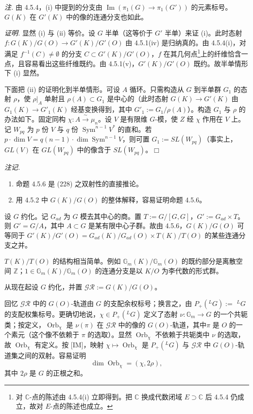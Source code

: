 \emph{注.} 由 4.5.4，(i) 中提到的分支由 $\operatorname{Im}(\pi_1(G)\to\pi_1(G'))$ 的元素标号。$G(K)$ 在 $G'(K)$ 中的像的连通分支也如此。

\emph{证明.} 显然 (i) 与 (ii) 等价。设 $G$ 半单（这等价于 $G'$ 半单）来证 (i)。此时态射 $f:G(K)/G(O)\to G'(K)/G'(O)$ 由 4.5.1(iv) 是归纳真的。由 4.5.4(i)，对满足 $f^{-1}(C)\ne\emptyset$ 的分支 $C\subset G'(K)/G'(O)$，$f$ 在其几何点\footnote{对 $\mathbb{C}$-点的陈述由 4.5.4(i) 立即得到。把 $\mathbb{C}$ 换成代数闭域 $E\supset\mathbb{C}$ 后 4.5.4 仍成立，故对 $E$-点的陈述也成立。}上的纤维恰含一点，且容易看出这些纤维既约。由 4.5.1(v)，$G'(K)/G'(O)$ 既约。故半单情形下 (i) 显然。


下面把 (ii) 的证明化到半单情形。可设 $A$ 循环。只需构造从 $G$ 到半单群 $G_1$ 的态射 $\rho$，使 $\rho|_A$ 单射且 $\rho(A)\subset G_1$ 是中心的（此时态射 $G(K)\to G'(K)$ 由 $G_1(K)\to G'_1(K)$ 经基变换得到，其中 $G'_1:=G_1/\rho(A)$）。构造 $G_1$ 与 $\rho$ 的办法如下。固定同构 $\chi:A\xrightarrow{\ \sim\ }\mu_n$。设 $V$ 是有限维 $G$-模，使 $Z$ 经 $\chi$ 作用在 $V$ 上。记 $W_{pq}$ 为 $p$ 份 $V$ 与 $q$ 份 $\operatorname{Sym}^{n-1}V^*$ 的直和。若 $p\cdot\dim V=q(n-1)\cdot\dim\operatorname{Sym}^{n-1}V$，则可置 $G_1:=SL(W_{pq})$（事实上，$GL(V)$ 在 $GL(W_{pq})$ 中的像含于 $SL(W_{pq})$。\hfill$\Box$

\emph{注记.}
\begin{enumerate}[label=(\roman*),leftmargin=2.2em]
\item 命题 4.5.6 是 (228) 之双射性的直接推论。
\item 用 4.5.2 中 $G(K)/G(O)$ 的整体解释，容易证明命题 4.5.6。
\end{enumerate}

 设 $G$ 约化。记 $G_{ad}$ 为 $G$ 模去其中心的商。置 $T:=G/[G,G]$，$G':=G_{ad}\times T$。则 $G'=G/A$，其中 $A\subset G$ 是某有限中心子群。故由 4.5.6，$G(K)/G(O)$ 可等同于 $G'(K)/G'(O)=G_{ad}(K)/G_{ad}(O)\times T(K)/T(O)$ 的某些连通分支之并。

$T(K)/T(O)$ 的结构相当简单。例如 $\mathbb{G}_m(K)/\mathbb{G}_m(O)$ 的既约部分是离散空间 $\mathbb{Z}$；$1\in\mathbb{G}_m(K)/\mathbb{G}_m(O)$ 的连通分支是以 $K/O$ 为李代数的形式群。

 从现在起设 $G$ 约化，并置 $\mathcal{GR}:=G(K)/G(O)$。

回忆 $\mathcal{GR}$ 中的 $G(O)$-轨道由 $G$ 的支配余权标号；换言之，由 $P_+({}^LG):=$ ${}^LG$ 的支配权集标号。更确切地说，$\chi\in P_+({}^LG)$ 定义了态射 $\nu:\mathbb{G}_m\to G$ 的一个共轭类；按定义，$\operatorname{Orb}_\chi$ 是 $\nu(\pi)$ 在 $\mathcal{GR}$ 中的像的 $G(O)$-轨道，其中$\pi$ 是 $O$ 的一个素元（这个像不依赖于 $\pi$ 的选取）。显然 $\operatorname{Orb}_\chi$ 不依赖于共轭类中 $\nu$ 的选取，故 $\operatorname{Orb}_\chi$ 有定义。按 [IM]，映射 $\chi\mapsto\operatorname{Orb}_\chi$ 是 $P_+({}^LG)$ 与 $\mathcal{GR}$ 中 $G(O)$-轨道集之间的双射。容易证明
\begin{equation}\tag{229}
\dim\operatorname{Orb}_\chi=(\chi,2\rho),
\end{equation}
其中 $2\rho$ 是 $G$ 的正根之和。

